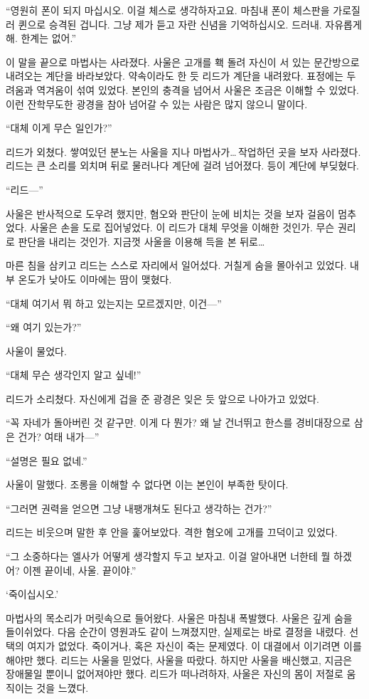 ``영원히 폰이 되지 마십시오. 이걸 체스로 생각하자고요. 마침내 폰이 체스판을 가로질러 퀸으로 승격된 겁니다. 그냥 제가 듣고 자란 신념을 기억하십시오. 드러내. 자유롭게 해. 한계는 없어.''

이 말을 끝으로 마법사는 사라졌다. 사울은 고개를 홱 돌려 자신이 서 있는 문간방으로 내려오는 계단을 바라보았다. 약속이라도 한 듯 리드가 계단을 내려왔다. 표정에는 두려움과 역겨움이 섞여 있었다. 본인의 충격을 넘어서 사울은 조금은 이해할 수 있었다. 이런 잔학무도한 광경을 참아 넘어갈 수 있는 사람은 많지 않으니 말이다.

``대체 이게 무슨 일인가?''

리드가 외쳤다. 쌓여있던 분노는 사울을 지나 마법사가\ldots\,작업하던 곳을 보자 사라졌다. 리드는 큰 소리를 외치며 뒤로 물러나다 계단에 걸려 넘어졌다. 등이 계단에 부딪혔다.

``리드—''

사울은 반사적으로 도우려 했지만, 혐오와 판단이 눈에 비치는 것을 보자 걸음이 멈추었다. 사울은 손을 도로 집어넣었다. 이 리드가 대체 무엇을 이해한 것인가. 무슨 권리로 판단을 내리는 것인가. 지금껏 사울을 이용해 득을 본 뒤로\ldots

마른 침을 삼키고 리드는 스스로 자리에서 일어섰다. 거칠게 숨을 몰아쉬고 있었다. 내부 온도가 낮아도 이마에는 땀이 맺혔다.

``대체 여기서 뭐 하고 있는지는 모르겠지만, 이건—''

``왜 여기 있는가?''

사울이 물었다.

``대체 무슨 생각인지 알고 싶네!''

리드가 소리쳤다. 자신에게 겁을 준 광경은 잊은 듯 앞으로 나아가고 있었다.

``꼭 자네가 돌아버린 것 같구만. 이게 다 뭔가? 왜 날 건너뛰고 한스를 경비대장으로 삼은 건가? 여태 내가—''

``설명은 필요 없네.''

사울이 말했다. 조롱을 이해할 수 없다면 이는 본인이 부족한 탓이다.

``그러면 권력을 얻으면 그냥 내팽개쳐도 된다고 생각하는 건가?''

리드는 비웃으며 말한 후 안을 훑어보았다. 격한 혐오에 고개를 끄덕이고 있었다.

``그 소중하다는 엘사가 어떻게 생각할지 두고 보자고. 이걸 알아내면 너한테 뭘 하겠어? 이젠 끝이네, 사울. 끝이야.''

`죽이십시오.'

마법사의 목소리가 머릿속으로 들어왔다. 사울은 마침내 폭발했다. 사울은 깊게 숨을 들이쉬었다. 다음 순간이 영원과도 같이 느껴졌지만, 실제로는 바로 결정을 내렸다. 선택의 여지가 없었다. 죽이거나, 혹은 자신이 죽는 문제였다. 이 대결에서 이기려면 이를 해야만 했다. 리드는 사울을 믿었다, 사울을 따랐다. 하지만 사울을 배신했고, 지금은 장애물일 뿐이니 없어져야만 했다. 리드가 떠나려하자, 사울은 자신의 몸이 저절로 움직이는 것을 느꼈다.

